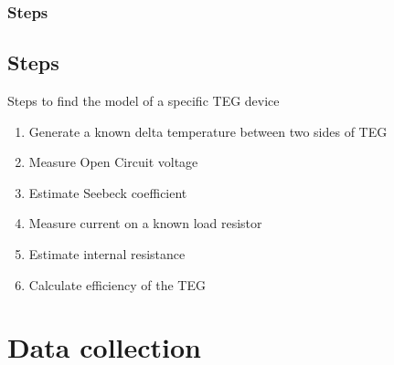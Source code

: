 \begin{frame}
    \frametitle{Steps}

\subsection{Steps}
\begin{block}{Steps to find the model of a specific TEG device}
\begin{enumerate}
    \item Generate a known delta temperature between two sides of TEG
    \item Measure Open Circuit voltage
    \item Estimate Seebeck coefficient
    \item Measure current on a known load resistor
    \item Estimate internal resistance
    \item Calculate efficiency of the TEG	
\end{enumerate}
\end{block}
\end{frame}


\section{Data collection}
